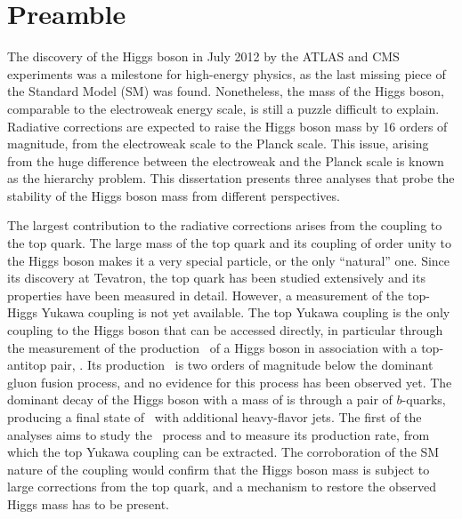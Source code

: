 \chapter*{Preamble}
\label{chapter:Preamble}

The discovery of the Higgs boson in July 2012 by the ATLAS and CMS experiments was a milestone for high-energy physics, as the last missing piece of the Standard Model (SM) was found.
Nonetheless, the mass of the Higgs boson, comparable to the electroweak energy scale, is still a puzzle difficult to explain. Radiative corrections are expected to raise the Higgs boson mass by 16 orders of magnitude, from the electroweak scale to the Planck scale. This issue,
arising from the huge difference between the electroweak and the Planck scale is known as the hierarchy problem.
This dissertation presents three analyses that probe the stability of the Higgs boson mass from different perspectives.

The largest contribution to the radiative corrections arises from the coupling to the top quark. The large mass of the top quark and its coupling of order unity to the Higgs boson makes it a very special particle, or the only ``natural'' one. Since its discovery at Tevatron, the top quark has been studied extensively and its properties have been measured in detail.
However, a measurement of the top-Higgs Yukawa coupling is not yet available.
The top Yukawa coupling is the only coupling to the Higgs boson that can be accessed directly, in particular through the measurement of the production \xsec\ of a Higgs boson in association with a top-antitop pair, \ttH. Its production \xsec\ is two orders of magnitude below the dominant gluon fusion process, and no evidence for this process has been observed yet. The dominant decay of the Higgs boson with a mass of \unit[125]{\gev} is through a pair of $b$-quarks, producing a final state of \ttbar\ with additional heavy-flavor jets. The first of the analyses aims to study the \ttH\ process and to measure its production rate, from which the top Yukawa coupling can be extracted. The corroboration of the SM nature of the coupling would confirm that the Higgs boson mass is subject to large corrections from the top quark, and a mechanism to restore the observed Higgs mass has to be present.

